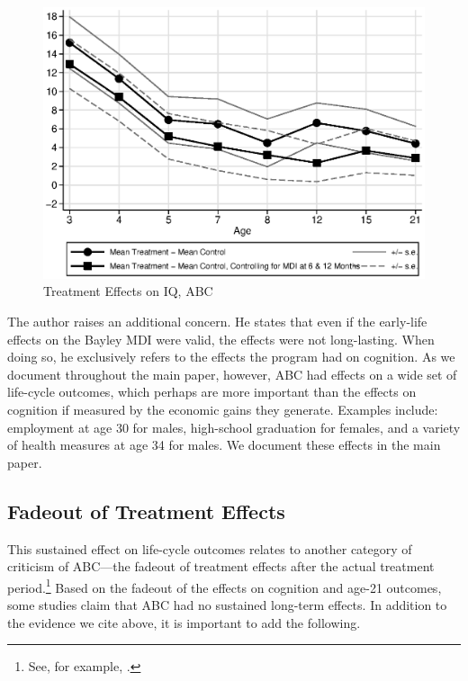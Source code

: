 \begin{appendices}
\begin{figure}[H]
		\caption{Treatment Effects on IQ, ABC} \label{fig:treatiqsabc}
		\includegraphics[width=.9\columnwidth]{output/abc_mdifixing_2.eps}
\end{figure}

\noindent The author raises an additional concern. He states that even if the early-life effects on the Bayley MDI were valid, the effects were not long-lasting. When doing so, he exclusively refers to the effects the program had on cognition. As we document throughout the main paper, however, ABC had effects on a wide set of life-cycle outcomes, which perhaps are more important than the effects on cognition if measured by the economic gains they generate. Examples include: employment at age 30 for males, high-school graduation for females, and a variety of health measures at age 34 for males. We document these effects in the main paper.\\

\subsection{Fadeout of Treatment Effects}

\noindent This sustained effect on life-cycle outcomes relates to another category of criticism of ABC---the fadeout of treatment effects after the actual treatment period.\footnote{See, for example, \citet{Besharov-etal_2011_ABCProject}.} Based on the fadeout of the effects on cognition and age-21 outcomes, some studies claim that ABC had no sustained long-term effects. In addition to the evidence we cite above, it is important to add the following.\\


\end{appendices}
